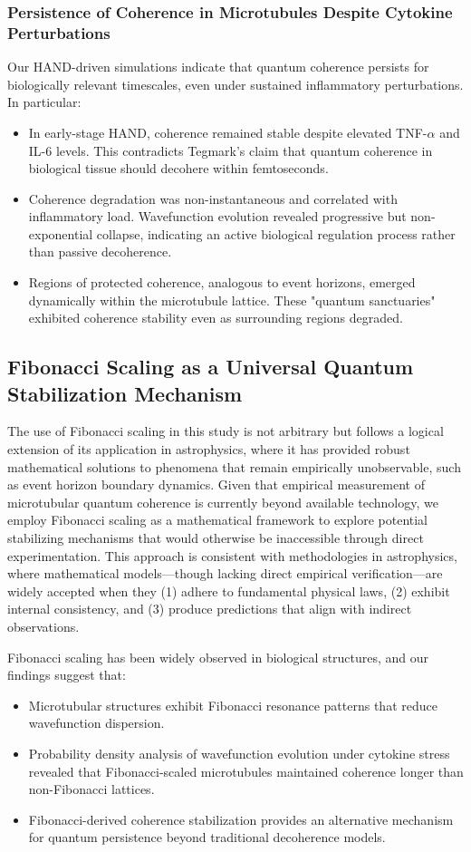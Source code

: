 \documentclass[entropy,article,submit,oneauthor,pdftex]{Definitions/mdpi}
\begin{document}
\subsubsection{Persistence of Coherence in Microtubules Despite Cytokine Perturbations}
Our HAND-driven simulations indicate that quantum coherence persists for biologically relevant timescales, even under sustained inflammatory perturbations. In particular:
\begin{itemize}
    \item In early-stage HAND, coherence remained stable despite elevated TNF-$\alpha$ and IL-6 levels. This contradicts Tegmark's claim that quantum coherence in biological tissue should decohere within femtoseconds.
    \item Coherence degradation was non-instantaneous and correlated with inflammatory load. Wavefunction evolution revealed progressive but non-exponential collapse, indicating an active biological regulation process rather than passive decoherence.
    \item Regions of protected coherence, analogous to event horizons, emerged dynamically within the microtubule lattice. These "quantum sanctuaries" exhibited coherence stability even as surrounding regions degraded.
\end{itemize}

\subsection{Fibonacci Scaling as a Universal Quantum Stabilization Mechanism}
The use of Fibonacci scaling in this study is not arbitrary but follows a logical extension of its application in astrophysics, where it has provided robust mathematical solutions to phenomena that remain empirically unobservable, such as event horizon boundary dynamics. Given that empirical measurement of microtubular quantum coherence is currently beyond available technology, we employ Fibonacci scaling as a mathematical framework to explore potential stabilizing mechanisms that would otherwise be inaccessible through direct experimentation. This approach is consistent with methodologies in astrophysics, where mathematical models—though lacking direct empirical verification—are widely accepted when they (1) adhere to fundamental physical laws, (2) exhibit internal consistency, and (3) produce predictions that align with indirect observations. 

Fibonacci scaling has been widely observed in biological structures, and our findings suggest that:
\begin{itemize}
\item Microtubular structures exhibit Fibonacci resonance patterns that reduce wavefunction dispersion.
\item Probability density analysis of wavefunction evolution under cytokine stress revealed that Fibonacci-scaled microtubules maintained coherence longer than non-Fibonacci lattices.
\item Fibonacci-derived coherence stabilization provides an alternative mechanism for quantum persistence beyond traditional decoherence models.
\end{itemize}
\end{document}
